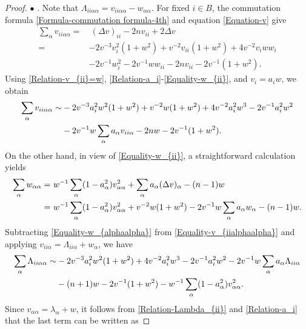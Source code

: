 \documentclass[11pt]{amsart}
\newcommand{\circled}[1]{
  \tikz[baseline=(char.base)]{
    \node[shape=circle,draw,inner sep=1pt] (char) {#1};
  }
}
\numberwithin{theorem}{section}
\numberwithin{equation}{section}
\begin{document}
\begin{proof}
$\bullet$ \circled{1}. Note that $\Lambda_{ii\alpha\alpha}=v_{ii\alpha\alpha}-w_{\alpha\alpha}$. For fixed $i\in B$, the commutation formula \eqref{Formula-commutation formula-4th} and equation \eqref{Equation-v} give
\begin{align*}
\sum_\alpha v_{ii\alpha\alpha}
=&~(\Delta v)_{ii}-2nv_{ii}+2\Delta v\\
=&-2v^{-3}v_i^2(1+w^2)+v^{-2}v_{ii}(1+w^2)+4v^{-2}v_iww_i\\
&-2v^{-1}w_i^2-2v^{-1}ww_{ii}-2nv_{ii}-2v^{-1}(1+w^2).
\end{align*}
Using \eqref{Relation-v_{ii}=w}, \eqref{Relation-a_i}-\eqref{Equality-w_{ii}}, and $v_i=a_iw$, we obtain
\begin{equation}\label{Equality-v_{iialphaalpha}}
\begin{aligned}
\sum_\alpha v_{ii\alpha\alpha}
\sim&-2v^{-3}a_i^2w^2(1+w^2)+v^{-2}w(1+w^2)+4v^{-2}a_i^2w^3-2v^{-1}a_i^2w^2\\
&-2v^{-1}w\sum_\alpha a_\alpha v_{ii\alpha}-2nw-2v^{-1}(1+w^2).
\end{aligned}
\end{equation}
On the other hand, in view of \eqref{Equality-w_{ii}}, a straightforward calculation yields
\begin{equation}\label{Equality-w_{alphaalpha}}
\begin{aligned}
\sum_\alpha w_{\alpha\alpha}
=&~w^{-1}\sum_\alpha(1-a_\alpha^2)v_{\alpha\alpha}^2+\sum_\alpha a_\alpha(\Delta v)_\alpha-(n-1)w\\
=&~w^{-1}\sum_\alpha(1-a_\alpha^2)v_{\alpha\alpha}^2+v^{-2}w(1+w^2)-2v^{-1}w\sum_\alpha a_\alpha w_\alpha-(n-1)w.
\end{aligned}
\end{equation}
Subtracting \eqref{Equality-w_{alphaalpha}} from \eqref{Equality-v_{iialphaalpha}} and applying $v_{ii\alpha}=\Lambda_{ii\alpha}+w_\alpha$, we have
\begin{equation}\label{Equality-Lambda_{iialphaalpha}}
\begin{aligned}
\sum_\alpha\Lambda_{ii\alpha\alpha}
\sim&-2v^{-3}a_i^2w^2(1+w^2)+4v^{-2}a_i^2w^3-2v^{-1}a_i^2w^2-2v^{-1}w\sum_\alpha a_\alpha\Lambda_{ii\alpha}\\
&-(n+1)w-2v^{-1}(1+w^2)-w^{-1}\sum_\alpha(1-a_\alpha^2)v_{\alpha\alpha}^2.
\end{aligned}
\end{equation}
Since $v_{\alpha\alpha}=\lambda_\alpha+w$, it follows from \eqref{Relation-Lambda_{ii}} and \eqref{Relation-a_i} that the last term can be written as 

\end{proof}
\end{document}
